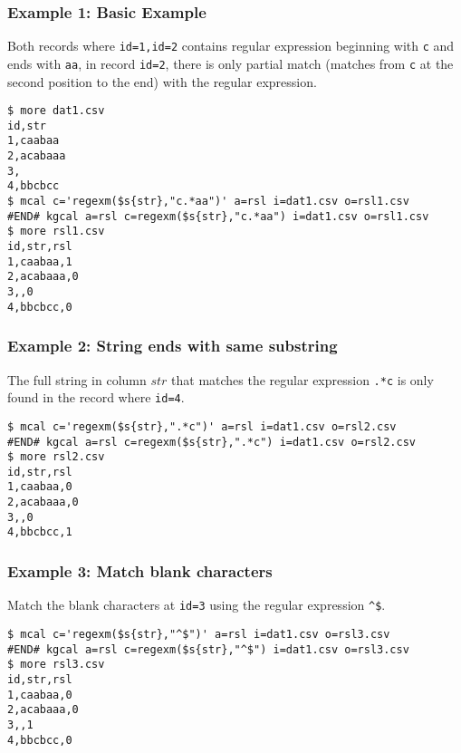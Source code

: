\subsubsection*{Example 1: Basic Example}

Both records where \verb|id=1,id=2| contains regular expression beginning with \verb|c| and ends with \verb|aa|, in record \verb|id=2|, there is only partial match (matches from \verb|c| at the second position to the end) with the regular expression.


\begin{Verbatim}[baselinestretch=0.7,frame=single]
$ more dat1.csv
id,str
1,caabaa
2,acabaaa
3,
4,bbcbcc
$ mcal c='regexm($s{str},"c.*aa")' a=rsl i=dat1.csv o=rsl1.csv
#END# kgcal a=rsl c=regexm($s{str},"c.*aa") i=dat1.csv o=rsl1.csv
$ more rsl1.csv
id,str,rsl
1,caabaa,1
2,acabaaa,0
3,,0
4,bbcbcc,0
\end{Verbatim}
\subsubsection*{Example 2: String ends with same substring}

The full string in column $str$ that matches the regular expression \verb|.*c| is only found in the record where \verb|id=4|.


\begin{Verbatim}[baselinestretch=0.7,frame=single]
$ mcal c='regexm($s{str},".*c")' a=rsl i=dat1.csv o=rsl2.csv
#END# kgcal a=rsl c=regexm($s{str},".*c") i=dat1.csv o=rsl2.csv
$ more rsl2.csv
id,str,rsl
1,caabaa,0
2,acabaaa,0
3,,0
4,bbcbcc,1
\end{Verbatim}
\subsubsection*{Example 3: Match blank characters}

Match the blank characters at \verb|id=3| using the regular expression \verb|^$|.


\begin{Verbatim}[baselinestretch=0.7,frame=single]
$ mcal c='regexm($s{str},"^$")' a=rsl i=dat1.csv o=rsl3.csv
#END# kgcal a=rsl c=regexm($s{str},"^$") i=dat1.csv o=rsl3.csv
$ more rsl3.csv
id,str,rsl
1,caabaa,0
2,acabaaa,0
3,,1
4,bbcbcc,0
\end{Verbatim}
